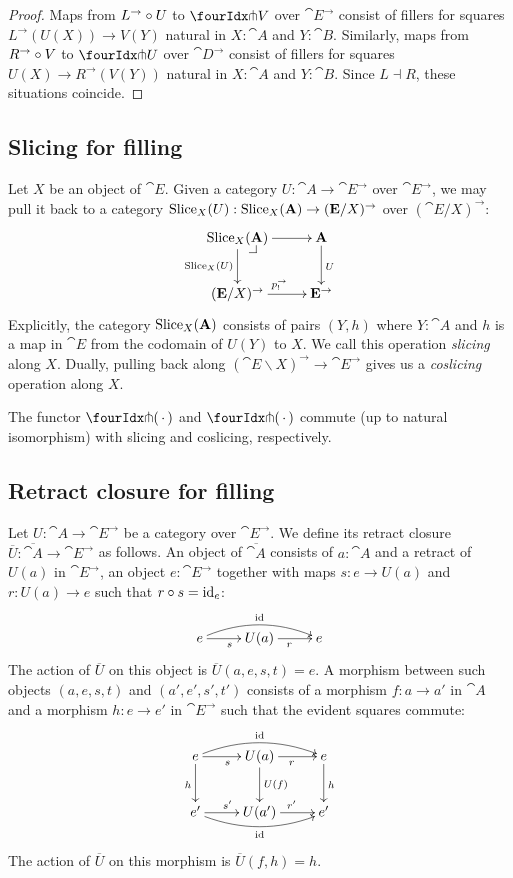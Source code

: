 \documentclass[reqno,10pt,a4paper,oneside]{amsart}
\begin{document}
\begin{proof}
Maps from $L^{\to} \mathbin{\circ} U$ to $\liftl{V}$ over $\cat{E}^{\to}$ consist of fillers for squares $L^{\to}(U(X)) \to V(Y)$ natural in $X : \cat{A}$ and $Y : \cat{B}$.
Similarly, maps from $R^{\to} \mathbin{\circ} V$ to $\liftr{U}$ over $\cat{D}^{\to}$ consist of fillers for squares $U(X) \to R^{\to}(V(Y))$ natural in $X : \cat{A}$ and $Y : \cat{B}$.
Since $L \dashv R$, these situations coincide.
\end{proof}

\subsection{Slicing for filling}

Let $X$ be an object of $\cat{E}$.
Given a category $U : \cat{A} \to \cat{E}^{\to}$ over $\cat{E}^{\to}$, we may pull it back to a category $\operatorname{Slice}_X(U) : \operatorname{Slice}_X(\mathbf{A}) \to (\mathbf{E}/X)^{\to}$ over $(\cat{E}/X)^{\to}$:
\[
\xymatrix{
  \Slice_X(\cat{A})
  \ar[r]
  \ar[d]_{\Slice_X(U)}
  \pullback{dr}
&
  \cat{A}
  \ar[d]^{U}
\\
  (\cat{E}/X)^{\to}
  \ar[r]^{p_!^{\to}}
&
  \cat{E}^{\to}
}
\]
Explicitly, the category $\operatorname{Slice}_X(\mathbf{A})$ consists of pairs $(Y, h)$ where $Y : \cat{A}$ and $h$ is a map in $\cat{E}$ from the codomain of $U(Y)$ to $X$.
We call this operation \emph{slicing} along $X$.
Dually, pulling back along $(\cat{E} \backslash X)^{\to} \to \cat{E}^{\to}$ gives us a \emph{coslicing} operation along $X$.

\begin{remark}
\label{pitchfork-slicing}
The functor $\liftr{\brarghole}$ and $\liftl{\brarghole}$ commute (up to natural isomorphism) with slicing and coslicing, respectively.
\end{remark}

\subsection{Retract closure for filling}

Let $U : \cat{A} \to \cat{E}^{\to}$ be a category over $\cat{E}^{\to}$.
We define its retract closure $\overline{U} : \overline{\cat{A}} \to \cat{E}^{\to}$ as follows.
An object of $\overline{\cat{A}}$ consists of $a : \cat{A}$ and a retract of $U(a)$ in $\cat{E}^{\to}$, \ie an object $e : \cat{E}^{\to}$ together with maps $s : e \to U(a)$ and $r : U(a) \to e$ such that $r \mathbin{\circ} s = \operatorname{id}_e$:
\[
\xymatrix{
  e
  \ar[r]_{s}
  \ar@/^1em/[rr]^{\id}
&
  U(a)
  \ar[r]_{r}
&
  e
}
\]
The action of $\overline{U}$ on this object is $\overline{U}(a, e, s, t) = e$.
A morphism between such objects $(a, e, s, t)$ and $(a', e', s', t')$ consists of a morphism $f : a \to a'$ in $\cat{A}$ and a morphism $h : e \to e'$ in $\cat{E}^{\to}$ such that the evident squares commute:
\[
\xymatrix{
  e
  \ar[r]_{s}
  \ar@/^1em/[rr]^{\id}
  \ar[d]_{h}
&
  U(a)
  \ar[r]_{r}
  \ar[d]^{U(f)}
&
  e
  \ar[d]^{h}
\\
  e'
  \ar[r]^{s'}
  \ar@/_1em/[rr]_{\id}
&
  U(a')
  \ar[r]^{r'}
&
  e'
}
\]
The action of $\overline{U}$ on this morphism is $\overline{U}(f, h) = h$.
\end{document}

